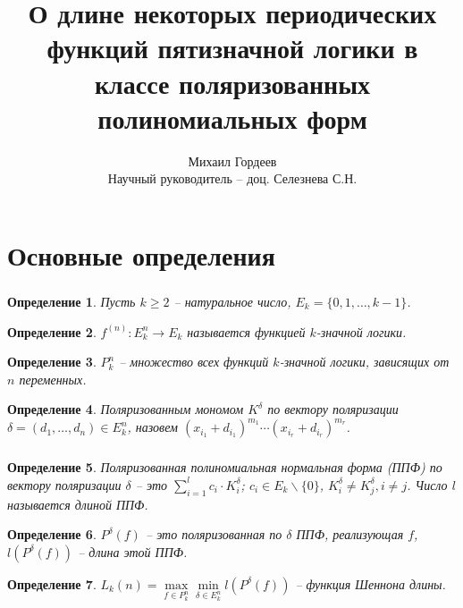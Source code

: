\documentclass[t]{beamer}
\title{О длине некоторых периодических функций пятизначной логики в классе поляризованных
    полиномиальных форм}
\author{Михаил Гордеев\\
\bigskip
Научный руководитель -- доц. Селезнева С.Н.\\}
\date{}
\newtheorem*{mydef}{Определение}
\begin{document}

\section{Основные определения}
\begin{frame}
\frametitle{\insertsection}
\begin{mydef}
Пусть $k \geqslant 2$ -- натуральное число, $E_k = \{0, 1, \dots, k - 1\}$.
\end{mydef}

\begin{mydef}
$f^{(n)} : E_k^n \rightarrow E_k$ называется функцией $k$-значной логики.
\end{mydef}

\begin{mydef}
$P_k^n$ -- множество всех функций $k$-значной логики, зависящих от $n$ переменных.
\end{mydef}

\begin{mydef}
Поляризованным мономом $K^{\delta}$ по вектору поляризации
$\delta = (d_1, \dots, d_n) \in E_k^n$, назовем
$(x_{i_1} + d_{i_1} )^{m_1}\cdots(x_{i_r} + d_{i_r})^{m_r}$.
\end{mydef}
\end{frame}

\begin{frame}
\frametitle{\insertsection}
\begin{mydef}
Поляризованная полиномиальная нормальная форма (ППФ) по вектору поляризации
$\delta$ -- это $\sum\limits_{i=1}^lc_i \cdot K^{\delta}_i$; $c_i \in E_k \backslash \{0\}$,
$K^{\delta}_i \neq K^{\delta}_j,i \neq j$. Число $l$ называется длиной ППФ.
\end{mydef}

\begin{mydef}
$P^{\delta}(f)$ -- это поляризованная по $\delta$ ППФ, реализующая $f$, $l(P^{\delta}(f))$ --
длина этой ППФ.
\end{mydef}

\begin{mydef}
$L_k(n) = \max\limits_{f\in P_k^n} \min\limits_{\delta \in E_k^n} l(P^{\delta}(f))$ -- функция
Шеннона длины.
\end{mydef}
\end{frame}
\end{document}
